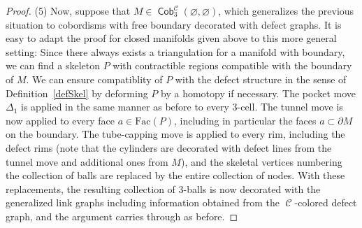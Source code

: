 \documentclass[10pt,a4paper]{amsart}
\DeclareMathOperator{\Cob}{\mathsf{Cob}}
\DeclareMathOperator{\calc}{\mathcal{C}}
\numberwithin{equation}{section}
\theoremstyle{definition}
\begin{document}
\begin{proof}
 (5) Now, suppose that $M \in \Cob_3^{\mathcal{C}}(\varnothing, \varnothing)$, which generalizes the previous situation to cobordisms with free boundary decorated with defect graphs. It is easy to adapt the proof for closed manifolds given above to this more general setting: Since there always exists a triangulation for a manifold with boundary, we can find a skeleton $P$ with contractible regions compatible with the boundary of $M$. We can ensure compatiblity of $P$ with the defect structure in the sense of Definition~\ref{defSkel} by deforming $P$ by a homotopy if necessary. The pocket move $\Delta_1$ is applied in the same manner as before to every 3-cell. The tunnel move  is now applied to every face $a \in \mathrm{Fac}(P)$, including in particular the faces $a \subset \partial M$ on the boundary. The tube-capping move is applied to every rim, including the defect rims (note that the cylinders are decorated with defect lines from the tunnel move and additional ones from $M$), and the skeletal vertices numbering the collection of balls are replaced by the entire collection of nodes. With these replacements, the resulting collection of 3-balls is now decorated with the generalized link graphs including information obtained from the $\calc$-colored defect graph, and the argument carries through as before. %
\end{proof}
\end{document}
